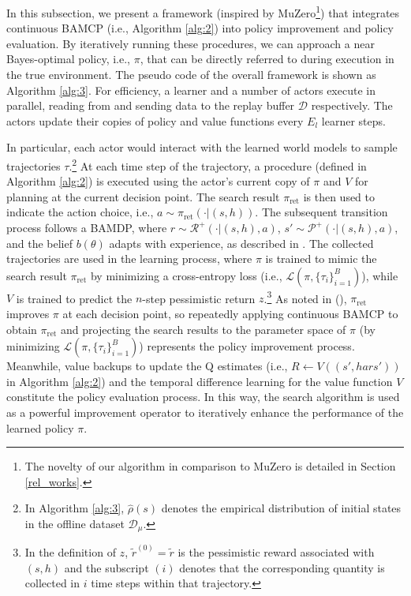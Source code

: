 In this subsection, we present a framework (inspired by MuZero\footnote{The novelty of our algorithm in comparison to MuZero is detailed in Section \ref{rel_works}.}) that integrates continuous BAMCP (i.e., Algorithm \ref{alg:2}) into policy improvement and policy evaluation. By iteratively running these procedures, we can approach a near Bayes-optimal policy, i.e., $\pi$, that can be directly referred to during execution in the true environment. The pseudo code of the overall framework is shown as Algorithm \ref{alg:3}. For efficiency, a learner and a number of actors execute in parallel, reading from and sending data to the replay buffer $\mathcal{D}$ respectively. The actors update their copies of policy and value functions every $E_l$ learner steps.

In particular, each actor would interact with the learned world models to sample trajectories $\tau$.\footnote{In Algorithm \ref{alg:3}, $\hat{\rho}(s)$ denotes the empirical distribution of initial states in the offline dataset $\mathcal{D}_\mu$.} At each time step of the trajectory, a  procedure (defined in Algorithm \ref{alg:2}) is executed using the actor's current copy of $\pi$ and $V$ for planning at the current decision point. The search result $\pi_{\text{ret}}$ is then used to indicate the action choice, i.e., $a \sim \pi_{\text{ret}}(\cdot|(s, h))$. The subsequent transition process follows a BAMDP, where $r \sim \mathcal{R}^+(\cdot|(s, h), a)$, $s' \sim \mathcal{P}^+(\cdot|(s, h), a)$, and the belief $b({\theta})$ adapts with experience, as described in . The collected trajectories are used in the learning process, where $\pi$ is trained to mimic the search result $\pi_{\text{ret}}$ by minimizing a cross-entropy loss (i.e., $\mathcal{L}(\pi, \{\tau_i\}_{i=1}^{B})$), while $V$ is trained to predict the $n$-step pessimistic return $z$.\footnote{In the definition of $z$, $\tilde{r}^{(0)}=\tilde{r}$ is the pessimistic reward associated with $(s, h)$ and the subscript $(i)$ denotes that the corresponding quantity is collected in $i$ time steps within that trajectory.} As noted in (\cite{DBLP:conf/icml/HubertSABSS21}), $\pi_{\text{ret}}$ improves $\pi$ at each decision point, so repeatedly applying continuous BAMCP to obtain $\pi_{\text{ret}}$ and projecting the search results to the parameter space of $\pi$ (by minimizing $\mathcal{L}(\pi, \{\tau_i\}_{i=1}^{B})$) represents the policy improvement process. Meanwhile, value backups to update the Q estimates (i.e., $R \leftarrow V((s', hars'))$ in Algorithm \ref{alg:2}) and the temporal difference learning for the value function $V$ constitute the policy evaluation process. In this way, the search algorithm is used as a powerful improvement operator to iteratively enhance the performance of the learned policy \(\pi\).

